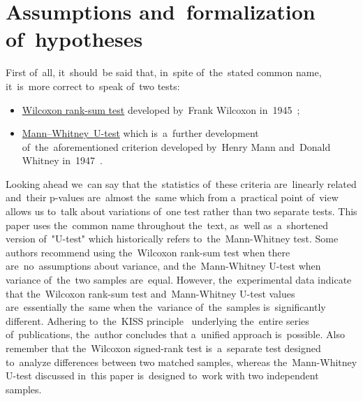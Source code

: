 \documentclass[russian,english]{scrreprt}
\begin{document}
\section{Assumptions and~formalization of~hypotheses}
First of~all, it~should~be said that, in~spite of~the~stated common name, it~is~more correct to~speak of~two tests:
\begin{itemize}
	\item \href{http://www.machinelearning.ru/wiki/index.php?title=Критерий_Уилкоксона_двухвыборочный}{Wilcoxon rank-sum test} developed by~Frank Wilcoxon in~1945~\cite{MLRU:Wilcoxon-test};
	\item \href{http://www.machinelearning.ru/wiki/index.php?title=Критерий_Уилкоксона-Манна"--~Уитни}{Mann--Whitney~U-test} which is~a~further development of~the~aforementioned criterion developed by~Henry Mann and~Donald Whitney in~1947~\cite{MLRU:Mann-Whitney}.
\end{itemize}
Looking ahead we~can say that the~statistics of~these criteria are~linearly related and~their p-values are~almost the~same which from a~practical point of~view allows us to~talk about variations of~one test rather than two separate tests. This paper uses the~common name throughout the~text, as~well as~a~shortened version of~"U-test" which historically refers to~the~Mann-Whitney test. Some authors\cite{Kobzarq-prikl-mathstat} recommend using the~Wilcoxon rank-sum test when there are~no~assumptions about variance, and the~Mann-Whitney U-test when variance of~the~two samples are~equal. However, the~experimental data indicate that the~Wilcoxon rank-sum test and~Mann-Whitney U-test values are~essentially the~same when the~variance of~the~samples is~significantly different. Adhering to~the~KISS principle~\cite{KISS-principle} underlying the~entire series of~publications, the~author concludes that a~unified approach is~possible. Also remember that the~Wilcoxon signed-rank test is~a~separate test designed to~analyze differences between two matched samples, whereas the~Mann-Whitney U-test discussed in~this paper is~designed to~work with two independent samples.
\end{document}
